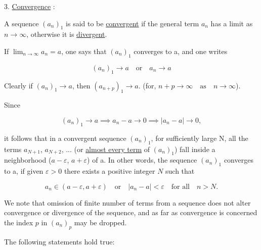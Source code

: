 \documentclass[11pt]{amsbook}
\begin{document}
    

    3. \underline{Convergence} : \par
    
    A sequence $(a_n)_1$ is said to be \underline{convergent} if the general term $a_n$ has a limit as $n \to \infty$, otherwise it is \underline{divergent}. \par
    
    If $\lim_{n \to \infty} a_n = a$, one says that $(a_n)_1$ converges to a, and one writes
    
        \[(a_n)_1 \to a \quad \text{or} \quad a_n \to a\]
    
    Clearly if $(a_n)_1 \to a$, then $(a_{n+p})_1 \to a$. (for, $n+p \to \infty \quad \text{as} \quad n \to \infty$). \par
    Since
    
        \[(a_n)_1 \to a \implies a_n - a \to 0 \implies |a_n - a| \to 0,\]
        
    it follows that in a convergent sequence $(a_n)_1$, for sufficiently large N, all the terms $a_{N + 1}$, $a_{N + 2}$, ... (or \underline{almost every term} of $(a_n)_1$) fall inside a neighborhood ($a - \varepsilon$, $a + \varepsilon$) of a. In other words, the sequence $(a_n)_1$ converges to a, if given $\varepsilon > 0$ there exists a positive integer $N$ such that 
    
        \[a_n \in (a - \varepsilon, a + \varepsilon) \quad \text{or} \quad |a_n - a| < \varepsilon \quad \text{for all} \quad n > N.\]
    
    We note that omission of finite number of terms from a sequence does not alter convergence or divergence of the sequence, and as far as convergence is concerned the index $p$ in $(a_n)_p$ may be dropped.\par
    
    The following statements hold true:
     
\end{document}
